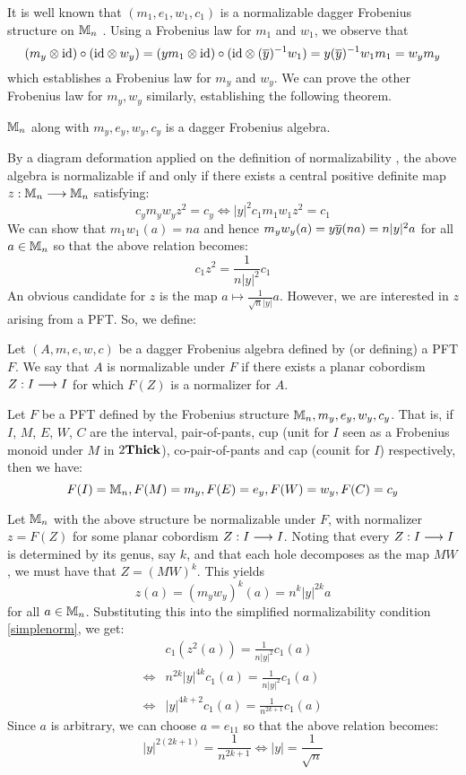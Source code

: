 \documentclass[./Thick_TQFTs_and_Quantum_Information.tex]{subfiles}
\begin{document}
It is well known that $(m_1, e_1, w_1, c_1)$ is a normalizable dagger Frobenius
structure on $\mathbb{M}_n$ \cite[8, 10]{CatQChan}. Using a Frobenius law for $m_1$
and $w_1$, we observe that
\[
  (m_y \otimes \text{id}) \circ (\text{id} \otimes w_y)
  = (ym_1 \otimes \text{id}) \circ (\text{id} \otimes (\overline{y})^{-1}w_1)
  = y(\overline{y})^{-1}w_1m_1
  = w_ym_y
\]
which establishes a Frobenius law for $m_y$ and $w_y$. We can prove the other
Frobenius law for $m_y, w_y$ similarly, establishing the following theorem.

\begin{thm}
$\mathbb{M}_n$ along with $m_y, e_y, w_y, c_y$ is a dagger Frobenius algebra.
\end{thm}

By a diagram deformation applied on the definition of normalizability
\cite[9]{CatQChan}, the above algebra is normalizable if and only if there
exists a central positive definite map $z : \mathbb{M}_n \stackrel{}{\longrightarrow} \mathbb{M}_n$ satisfying:
\[
  c_ym_yw_yz^2 = c_y \iff |y|^2c_1m_1w_1z^2 = c_1
\]
We can show that $m_1w_1(a) = na$ and hence $m_yw_y(a) = y\overline{y} (na)
= n|y|^2 a$ for all $a \in \mathbb{M}_n$ so that the above relation becomes:
\begin{equation}\label{simplenorm}
  c_1z^2 = \frac{1}{n|y|^2}c_1
\end{equation}
An obvious candidate for $z$ is the map $a \mapsto \frac{1}{\sqrt{n}|y|} a$.
However, we are interested in $z$ arising from a PFT. So, we define:
\begin{defn}
Let $(A, m, e, w, c)$ be a dagger Frobenius algebra defined by (or defining) a
PFT $F$. We say that $A$ is normalizable under $F$ if there exists a planar
cobordism $Z : I \stackrel{}{\longrightarrow} I$ for which $F(Z)$ is a normalizer for $A$.
\end{defn}

Let $F$ be a PFT defined by the Frobenius structure $\mathbb{M}_n, m_y, e_y, w_y, c_y$.
That is, if $I$, $M$, $E$, $W$, $C$ are the interval, pair-of-pants, cup (unit
for $I$ seen as a Frobenius monoid under $M$ in $2\textbf{Thick}$), co-pair-of-pants and
cap (counit for $I$) respectively, then we have:
\[
  F(I) = \mathbb{M}_n, F(M) = m_y, F(E) = e_y, F(W) = w_y, F(C) = c_y
\]

Let $\mathbb{M}_{n}$ with the above structure be normalizable under $F$, with normalizer
$z = F(Z)$ for some planar cobordism $Z : I \stackrel{}{\longrightarrow} I$. Noting that every
$Z : I \stackrel{}{\longrightarrow} I$ is determined by its genus, say $k$, and that each hole
decomposes as the map $MW$, we must have that $Z = (MW)^k$. This yields
\[
  z(a) = (m_yw_y)^k(a) = n^{k}|y|^{2k}a
\]
for all $a \in \mathbb{M}_n$. Substituting this into the simplified normalizability
condition \eqref{simplenorm}, we get:
\begin{align*}
       & c_1(z^2(a)) = \frac{1}{n|y|^2} c_1(a)\\
  \iff & n^{2k}|y|^{4k} c_1(a) = \frac{1}{n|y|^2} c_1(a)\\
  \iff & |y|^{4k + 2}c_1(a) = \frac{1}{n^{2k + 1}} c_1(a)
\end{align*}
Since $a$ is arbitrary, we can choose $a = e_{11}$ so that the above relation
becomes:
\[
  |y|^{2(2k + 1)} = \frac{1}{n^{2k + 1}}
  \iff |y| = \frac{1}{\sqrt{n}}
\]
\end{document}
